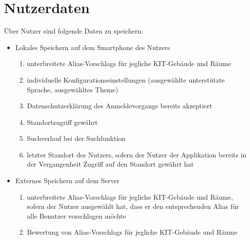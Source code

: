 \section{Nutzerdaten}

Über Nutzer sind folgende Daten zu speichern:
\begin{itemize}
	\item Lokales Speichern auf dem Smartphone des Nutzers
	\begin{enumerate}[label=\textbf{/D\arabic*0/}, align=left]
		\item unterbreitete \Glspl{Alias-Vorschlag} für jegliche \Gls{KIT}-Gebäude und Räume
		\item individuelle Konfigurationseinstellungen (ausgewählte unterstützte Sprache, ausgewähltes \Gls{Theme})
		\item Datenschutzerklärung des Anmeldevorgangs bereits akzeptiert
		\item Standortzugriff gewährt
		\item Suchverlauf bei der Suchfunktion
		\item letzter Standort des Nutzers, sofern der Nutzer der Applikation bereits in der Vergangenheit Zugriff auf den Standort gewährt hat
	\end{enumerate}
	\item Externes Speichern auf dem Server
	\begin{enumerate}[label=\textbf{/D\arabic*0/}, align=left, resume]
		\item unterbreitete \Glspl{Alias-Vorschlag} für jegliche \Gls{KIT}-Gebäude und Räume, sofern der Nutzer ausgewählt hat, dass er den entsprechenden \Gls{Alias} für alle Benutzer vorschlagen möchte
		\item Bewertung von \Glspl{Alias-Vorschlag} für jegliche \Gls{KIT}-Gebäude und Räume
	\end{enumerate}
\end{itemize}